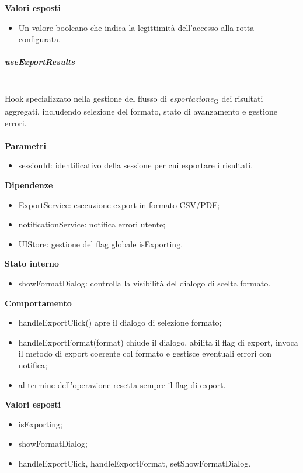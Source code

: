 \documentclass[a4paper,12pt]{article}
\begin{document}
                \textbf{Valori esposti}
                \begin{itemize}
                    \item Un valore booleano che indica la legittimità dell'accesso alla rotta configurata.
                \end{itemize}

                \subparagraph{useExportResults}\mbox{}\\
                Hook specializzato nella gestione del flusso di \textit{esportazione}\textsubscript{\href{https://atlasteam9.github.io/Atlas/glossario.html\#Esportazione}{G}} dei risultati aggregati, includendo selezione del formato, stato di avanzamento e gestione errori.\\\\
                \textbf{Parametri}
                \begin{itemize}
                    \item {\ttfamily sessionId}: identificativo della sessione per cui esportare i risultati.
                \end{itemize}
                \textbf{Dipendenze}
                \begin{itemize}
                    \item {\ttfamily ExportService}: esecuzione export in formato CSV/PDF;
                    \item {\ttfamily notificationService}: notifica errori utente;
                    \item {\ttfamily UIStore}: gestione del flag globale {\ttfamily isExporting}.
                \end{itemize}
                \textbf{Stato interno}
                \begin{itemize}
                    \item {\ttfamily showFormatDialog}: controlla la visibilità del dialogo di scelta formato.
                \end{itemize}
                \textbf{Comportamento}
                \begin{itemize}
                    \item {\ttfamily handleExportClick()} apre il dialogo di selezione formato;
                    \item {\ttfamily handleExportFormat(format)} chiude il dialogo, abilita il flag di export, invoca il metodo di export coerente col formato e gestisce eventuali errori con notifica;
                    \item al termine dell'operazione resetta sempre il flag di export.
                \end{itemize}
                \textbf{Valori esposti}
                \begin{itemize}
                    \item {\ttfamily isExporting};
                    \item {\ttfamily showFormatDialog};
                    \item {\ttfamily handleExportClick}, {\ttfamily handleExportFormat}, {\ttfamily setShowFormatDialog}.
                \end{itemize}
\end{document}
